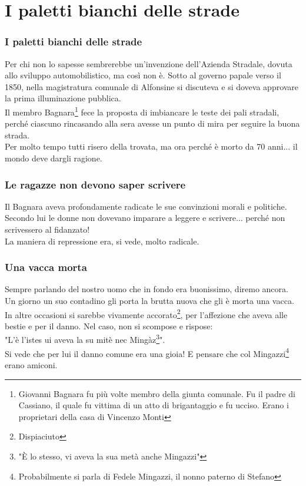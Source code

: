 
\chapter{I paletti bianchi delle strade}
\subsection{I paletti bianchi delle strade}
Per chi non lo sapesse sembrerebbe un'invenzione dell'Azienda Stradale, dovuta allo sviluppo automobilistico, ma così non è. Sotto al governo papale verso il 1850, nella magistratura comunale di Alfonsine si discuteva e si doveva approvare la prima illuminazione pubblica.\\
Il membro Bagnara\footnote{Giovanni Bagnara fu più volte membro della giunta comunale. Fu il padre di Cassiano, il quale fu vittima di un atto di brigantaggio e fu ucciso. Erano i proprietari della casa di Vincenzo Monti} fece la proposta di imbiancare le teste dei pali stradali, perché ciascuno rincasando alla sera avesse un punto di mira per seguire la buona strada.\\
Per molto tempo tutti risero della trovata, ma ora perché è morto da 70 anni... il mondo deve dargli ragione.

\subsection{Le ragazze non devono saper scrivere}
Il Bagnara aveva profondamente radicate le sue convinzioni morali e politiche.\\
Secondo lui le donne non dovevano imparare a leggere e scrivere... perché non scrivessero al fidanzato!\\
La maniera di repressione era, si vede, molto radicale.\\

\subsection{Una vacca morta}
Sempre parlando del nostro uomo che in fondo era buonissimo, diremo ancora.\\
Un giorno un suo contadino gli porta la brutta nuova che gli è morta una vacca. In altre occasioni si sarebbe vivamente accorato\footnote{Dispiaciuto}, per l'affezione che aveva alle bestie e per il danno. Nel caso, non si scompose e rispose:\\
"L'è l'istes ui aveva la su mitè nec Mingàz\footnote{"È lo stesso, vi aveva la sua metà anche Mingazzi"}". \\
Si vede che per lui il danno comune era una gioia! E pensare che col Mingazzi\footnote{Probabilmente si parla di Fedele Mingazzi, il nonno paterno di Stefano} erano amiconi.


